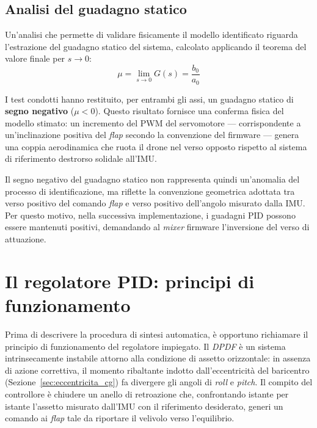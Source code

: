 \documentclass[11pt]{report}
\begin{document}
\subsection{Analisi del guadagno statico}

Un'analisi che permette di validare fisicamente il modello identificato riguarda l'estrazione del guadagno statico del sistema, calcolato applicando il teorema del valore finale per $s \to 0$:
\begin{equation}
	\mu = \lim_{s \to 0} G(s) = \frac{b_0}{a_0}
	\label{eq:guadagno_statico}
\end{equation}

I test condotti hanno restituito, per entrambi gli assi, un guadagno statico di \textbf{segno negativo} ($\mu < 0$). Questo risultato fornisce una conferma fisica del modello stimato: un incremento del PWM del servomotore --- corrispondente a un'inclinazione positiva del \textit{flap} secondo la convenzione del firmware --- genera una coppia aerodinamica che ruota il drone nel verso opposto rispetto al sistema di riferimento destrorso solidale all'IMU.

Il segno negativo del guadagno statico non rappresenta quindi un'anomalia del processo di identificazione, ma riflette la convenzione geometrica adottata tra verso positivo del comando \textit{flap} e verso positivo dell'angolo misurato dalla IMU. Per questo motivo, nella successiva implementazione, i guadagni PID possono essere mantenuti positivi, demandando al \textit{mixer} firmware l'inversione del verso di attuazione.

\section{Il regolatore PID: principi di funzionamento}
\label{sec:principi_pid}

Prima di descrivere la procedura di sintesi automatica, è opportuno richiamare il principio di funzionamento del regolatore impiegato. Il \textit{DPDF} è un sistema intrinsecamente instabile attorno alla condizione di assetto orizzontale: in assenza di azione correttiva, il momento ribaltante indotto dall'eccentricità del baricentro (Sezione~\ref{sec:eccentricita_cg}) fa divergere gli angoli di \textit{roll} e \textit{pitch}. Il compito del controllore è chiudere un anello di retroazione che, confrontando istante per istante l'assetto misurato dall'IMU con il riferimento desiderato, generi un comando ai \textit{flap} tale da riportare il velivolo verso l'equilibrio.
\end{document}
